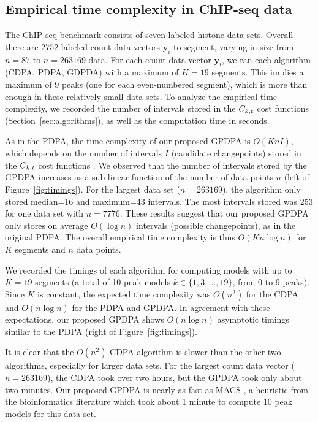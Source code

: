 \documentclass[aoas]{imsart}
\begin{document}
\subsection{Empirical time complexity in ChIP-seq data}
\label{sec:results_time}

The ChIP-seq benchmark consists of seven labeled histone data
sets.
Overall there are 2752 labeled count data vectors $\mathbf y_i$ to segment,
varying in size from $n=87$ to $n=263169$ data. For each count data
vector $\mathbf y_i$, we ran each algorithm (CDPA, PDPA, GDPDA) with a
maximum of $K=19$ segments. This implies a maximum of 9 peaks (one for
each even-numbered segment), which is more than enough in these
relatively small data sets. To analyze the empirical time complexity,
we recorded the number of intervals stored in the $C_{k,t}$ cost
functions (Section~\ref{sec:algorithms}), as well as the computation
time in seconds.


As in the PDPA, the time complexity of our proposed GPDPA is
$O(K n I)$, which depends on the number of intervals $I$ (candidate
changepoints) stored in the $C_{k,t}$ cost functions
\citep{pruned-dp-new}. We observed that the number of intervals stored
by the GPDPA increases as a sub-linear function of the number of data
points $n$ (left of Figure~\ref{fig:timings}). For the largest data
set ($n=263169$), the algorithm only stored median=16 and maximum=43
intervals. The most intervals stored was 253 for one data set with
$n=7776$. These results suggest that our proposed GPDPA only stores on
average $O(\log n)$ intervals (possible changepoints), as in the
original PDPA. The overall empirical time complexity is thus
$O(K n \log n)$ for $K$ segments and $n$ data points.

We recorded the timings of each algorithm for computing models with up
to $K=19$ segments (a total of 10 peak models $k\in\{1,3,\dots,19\}$,
from 0 to 9 peaks). Since $K$ is constant, the expected time
complexity was $O(n^2)$ for the CDPA and $O(n \log n)$ for the PDPA
and GPDPA. In agreement with these expectations, our proposed GPDPA
shows $O(n\log n)$ asymptotic timings similar to the PDPA (right of
Figure~\ref{fig:timings}). 

It is clear that the $O(n^2)$ CDPA algorithm is slower than the other
two algorithms, especially for larger data sets. For the largest count
data vector ($n=263169$), the CDPA took over two hours, but the GPDPA
took only
about two minutes. Our proposed GPDPA is nearly as fast as MACS
\citep{MACS}, a heuristic from the bioinformatics literature which
took about 1 minute to compute 10 peak models for this data set. 
\end{document}
